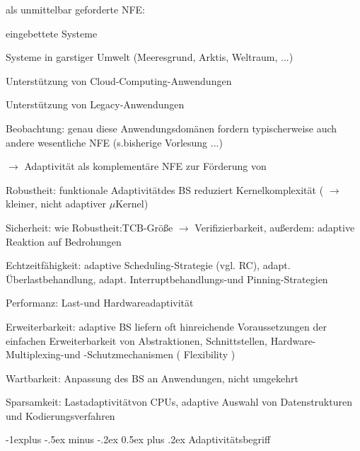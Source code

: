 \documentclass[a4paper]{article}
\makeatletter
\renewcommand{\subsection}{\@startsection{subsection}{2}{0mm}%
 {-1explus -.5ex minus -.2ex}%
 {0.5ex plus .2ex}%
 {\normalfont\normalsize\bfseries}}
\makeatother
\begin{document}
\begin{multicols}{3}
    \begin{itemize*}
        \item
        als unmittelbar geforderte NFE:
        \begin{itemize*}
            \item eingebettete Systeme
            \item Systeme in garstiger Umwelt (Meeresgrund, Arktis, Weltraum, ...)
            \item Unterstützung von Cloud-Computing-Anwendungen
            \item Unterstützung von Legacy-Anwendungen
        \end{itemize*}
        \item
        Beobachtung: genau diese Anwendungsdomänen fordern typischerweise auch
        andere wesentliche NFE (s.bisherige Vorlesung ...)
        \item
        $\rightarrow$ Adaptivität als komplementäre NFE zur
        Förderung von
        \begin{itemize*}
            \item Robustheit: funktionale Adaptivitätdes BS reduziert Kernelkomplexität ( $\rightarrow$ kleiner, nicht adaptiver $\mu$Kernel)
            \item Sicherheit: wie Robustheit:TCB-Größe $\rightarrow$ Verifizierbarkeit, außerdem: adaptive Reaktion auf Bedrohungen
            \item Echtzeitfähigkeit: adaptive Scheduling-Strategie (vgl. RC), adapt. Überlastbehandlung, adapt. Interruptbehandlungs-und Pinning-Strategien
            \item Performanz: Last-und Hardwareadaptivität
            \item Erweiterbarkeit: adaptive BS liefern oft hinreichende Voraussetzungen der einfachen Erweiterbarkeit von Abstraktionen, Schnittstellen, Hardware-Multiplexing-und -Schutzmechanismen ( Flexibility )
            \item Wartbarkeit: Anpassung des BS an Anwendungen, nicht umgekehrt
            \item Sparsamkeit: Lastadaptivitätvon CPUs, adaptive Auswahl von Datenstrukturen und Kodierungsverfahren
        \end{itemize*}
    \end{itemize*}


    \subsection{Adaptivitätsbegriff}


\end{multicols}
\end{document}
